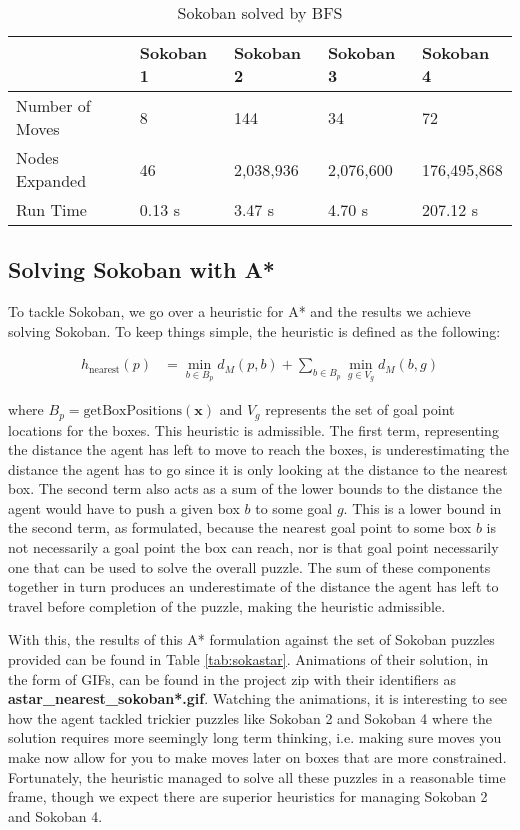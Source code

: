 \documentclass{article}[12pt]
\begin{document}
	\begin{table}[ht]
   \centering
   \begin{tabular}{l | l | l | l | l }
   \hline
    & Sokoban 1 & Sokoban 2 & Sokoban 3 & Sokoban 4\\
    \hline \hline 
   Number of Moves & 8 & 144 & 34 & 72 \\
   Nodes Expanded & 46 & 2,038,936 & 2,076,600 & 176,495,868\\
   Run Time & 0.13 s & 3.47 s & 4.70 s & 207.12 s\\
   \hline
   \end{tabular}
   \caption{Sokoban solved by BFS} \label{tab:sokbfs}
   \end{table}	
	
	\subsection{Solving Sokoban with A*}
	To tackle Sokoban, we go over a heuristic for A* and the results we achieve solving Sokoban. To keep things simple, the heuristic is defined as the following:
	
	\begin{align*}
	h_{\text{nearest}}(p) &= \min_{b \in B_p} d_{M}(p, b) + \sum_{b \in B_p} \min_{g \in V_g} d_{M}(b,g)
	\end{align*}
	
	where $B_p = \text{getBoxPositions}\left(\boldsymbol{x}\right)$ and $V_g$ represents the set of goal point locations for the boxes. This heuristic is admissible. The first term, representing the distance the agent has left to move to reach the boxes, is underestimating the distance the agent has to go since it is only looking at the distance to the nearest box. The second term also acts as a sum of the lower bounds to the distance the agent would have to push a given box $b$ to some goal $g$. This is a lower bound in the second term, as formulated, because the nearest goal point to some box $b$ is not necessarily a goal point the box can reach, nor is that goal point necessarily one that can be used to solve the overall puzzle. The sum of these components together in turn produces an underestimate of the distance the agent has left to travel before completion of the puzzle, making the heuristic admissible.
	
	With this, the results of this A* formulation against the set of Sokoban puzzles provided can be found in Table \ref{tab:sokastar}. Animations of their solution, in the form of GIFs, can be found in the project zip with their identifiers as \textbf{astar\_nearest\_sokoban*.gif}. Watching the animations, it is interesting to see how the agent tackled trickier puzzles like Sokoban 2 and Sokoban 4 where the solution requires more seemingly long term thinking, i.e. making sure moves you make now allow for you to make moves later on boxes that are more constrained. Fortunately, the heuristic managed to solve all these puzzles in a reasonable time frame, though we expect there are superior heuristics for managing Sokoban 2 and Sokoban 4.
	
\end{document}
